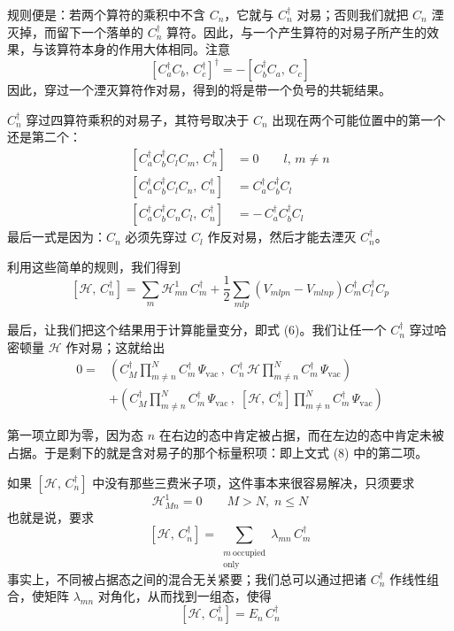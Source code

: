 规则便是：若两个算符的乘积中不含 $C_n$，它就与 $C_n^{\dagger}$ 对易；否则我们就把 $C_n$ 湮灭掉，而留下一个落单的 $C_n^{\dagger}$ 算符。因此，与一个产生算符的对易子所产生的效果，与该算符本身的作用大体相同。注意
\begin{equation*}
\left[C_a^{\dagger} C_b,\, C_c^{\dagger}\right]^{\dagger} = -\left[C_b^{\dagger} C_a,\, C_c\right]
\end{equation*}
因此，穿过一个湮灭算符作对易，得到的将是带一个负号的共轭结果。

$C_n^{\dagger}$ 穿过四算符乘积的对易子，其符号取决于 $C_n$ 出现在两个可能位置中的第一个还是第二个：
\begin{align*}
\left[C_a^{\dagger} C_b^{\dagger} C_l C_m,\, C_n^{\dagger}\right] &= 0\qquad l,\, m \neq n\\
\left[C_a^{\dagger} C_b^{\dagger} C_l C_n,\, C_n^{\dagger}\right] &= C_a^{\dagger} C_b^{\dagger} C_l\\
\left[C_a^{\dagger} C_b^{\dagger} C_n C_l,\, C_n^{\dagger}\right] &= -\,C_a^{\dagger} C_b^{\dagger} C_l
\end{align*}
最后一式是因为：$C_n$ 必须先穿过 $C_l$ 作反对易，然后才能去湮灭 $C_n^{\dagger}$。

利用这些简单的规则，我们得到
\begin{equation*}
\left[\mathcal{H},\, C_n^{\dagger}\right] = \sum_m \mathcal{H}^1_{mn}\, C_m^{\dagger} + \frac{1}{2}\sum_{mlp}\left(V_{mlpn} - V_{mlnp}\right) C_m^{\dagger} C_l^{\dagger} C_p
\tag{7}
\end{equation*}

最后，让我们把这个结果用于计算能量变分，即式 (6)。我们让任一个 $C_n^{\dagger}$ 穿过哈密顿量 $\mathcal{H}$ 作对易；这就给出
\begin{align*}
0 = {}& \left(C_M^{\dagger} \prod_{m\neq n}^{N} C_m^{\dagger}\,\Psi_{\mathrm{vac}}\,,\; C_n^{\dagger}\,\mathcal{H} \prod_{m\neq n}^{N} C_m^{\dagger}\,\Psi_{\mathrm{vac}}\right)\\
&+ \left(C_M^{\dagger} \prod_{m\neq n}^{N} C_m^{\dagger}\,\Psi_{\mathrm{vac}}\,,\; \left[\mathcal{H},\, C_n^{\dagger}\right] \prod_{m\neq n}^{N} C_m^{\dagger}\,\Psi_{\mathrm{vac}}\right)
\tag{8}
\end{align*}

第一项立即为零，因为态 $n$ 在右边的态中肯定被占据，而在左边的态中肯定未被占据。于是剩下的就是含对易子的那个标量积项：即上文式 (8) 中的第二项。

如果 $\left[\mathcal{H},\, C_n^{\dagger}\right]$ 中没有那些三费米子项，这件事本来很容易解决，只须要求
\begin{equation*}
\mathcal{H}^1_{Mn} = 0\qquad M > N,\; n \leq N
\end{equation*}
也就是说，要求
\begin{equation*}
\left[\mathcal{H},\, C_n^{\dagger}\right] = \sum_{\substack{m\ \text{occupied}\\ \text{only}}} \lambda_{mn}\, C_m^{\dagger}
\end{equation*}
事实上，不同被占据态之间的混合无关紧要；我们总可以通过把诸 $C_n^{\dagger}$ 作线性组合，使矩阵 $\lambda_{mn}$ 对角化，从而找到一组态，使得
\begin{equation*}
\left[\mathcal{H},\, C_n^{\dagger}\right] = E_n\, C_n^{\dagger}
\end{equation*}

